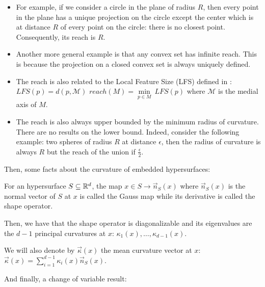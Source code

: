 \begin{itemize}
    \item For example, if we consider a circle in the plane of radius $ R $,
        then every point in the plane has a unique projection on the circle
        except the center which is at distance $ R $ of every point on the
        circle: there is no closest point.  Consequently, its reach is $ R $.

    \item Another more general example is that any convex set has infinite
        reach. This is because the projection on a closed convex set is always
        uniquely defined.

    \item The reach is also related to the Local Feature Size (LFS) defined in
        \cite{amenta1999surface}: $ LFS(p) = d(p, \mathcal{M}) $ $ reach(M) =
        \min\limits_{p \in M}~LFS(p) $ where $ \mathcal{M}  $ is the medial axis
        of $ M $.

    \item The reach is also always upper bounded by the minimum radius of
        curvature. There are no results on the lower bound. Indeed, consider the
        following example: two spheres of radius $ R $ at distance $ \epsilon $,
        then the radius of curvature is always $ R $ but the reach of the union
        if $ \frac{\epsilon}{2} $.
\end{itemize}

Then, some facts about the curvature of embedded hypersurfaces:

\begin{proposition}
    For an hypersurface $ S \subseteq \mathbb{R}^d $, the map $ x \in S \rightarrow
    \vec{n}_S(x) $ where $ \vec{n}_S(x) $ is the normal vector of $ S $ at $ x $ is
    called the Gauss map while its derivative is called the shape operator.

    Then, we have that the shape operator is diagonalizable and its eigenvalues
    are the $ d-1 $ principal curvatures at $ x $: $ \kappa_1(x), \ldots,
    \kappa_{d-1}(x) $.

    We will also denote by $ \vec{\kappa}(x) $ the mean curvature vector at $ x
    $: $ \vec{\kappa}(x) = \sum_{i=1}^{d-1} \kappa_i(x) \vec{n}_S(x) $.
\end{proposition}

And finally, a change of variable result:

